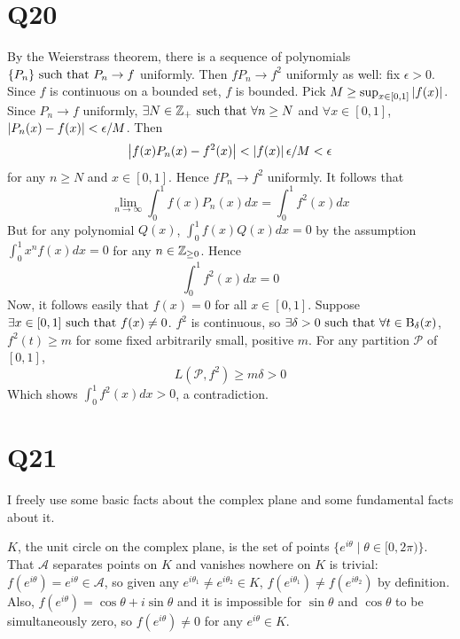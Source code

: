 \documentclass[12pt]{article}
\begin{document}
\section*{Q20}
By the Weierstrass theorem, there is a sequence of polynomials $\{P_n\} \text{ such that } P_n \rightarrow f$ uniformly. 
Then $f P_n \rightarrow f^2$ uniformly as well: 
fix $\epsilon > 0$. 
Since $f$ is continuous on a bounded set, $f$ is bounded.
Pick $M \geq \sup_{x \in [0, 1]} \left|f(x)\right|$. 
Since $P_n \rightarrow f$ uniformly, $\exists N \in \mathbb{Z}_{+} \text{ such that } \forall n \geq N$ and $\forall x \in [0, 1]$, $\left|P_n(x) - f(x)\right| < \epsilon / M$. 
Then 
$$\left|f(x) P_n(x) - f^2(x)\right| < \left|f(x)\right| \epsilon / M < \epsilon$$
for any $n \geq N$ and $x \in [0, 1]$. 
Hence $f P_n \rightarrow f^2$ uniformly. 
It follows that 
$$\lim_{n \rightarrow \infty} \int_{0}^{1} f(x) P_n(x) dx = \int_{0}^{1} f^2(x) dx$$ 
But for any polynomial $Q(x)$, $\int_{0}^{1} f(x) Q(x)dx = 0$ by the assumption $\int_{0}^{1} x^n f(x) dx = 0$ for any $n \in \mathbb{Z}_{\geq 0}$.  
Hence 
$$\int_{0}^{1} f^2 (x) dx = 0$$ 
Now, it follows easily that $f(x) = 0$ for all $x \in [0, 1]$. 
Suppose $\exists x \in [0, 1] \text{ such that } f(x) \neq 0$. 
$f^2$ is continuous, so $\exists \delta > 0 \text{ such that } \forall t \in \text{B}_{\delta}(x)$, $f^2(t) \geq m$ for some fixed arbitrarily small, positive $m$. 
For any partition $\mathcal{P}$ of $[0, 1]$, 
$$L(\mathcal{P}, f^2) \geq m\delta > 0$$ 
Which shows $\int_{0}^{1} f^2 (x) dx > 0$, a contradiction. 

\section*{Q21}
I freely use some basic facts about the complex plane and some fundamental facts about it. 

$K$, the unit circle on the complex plane, is the set of points $\{e^{i\theta} \mid \theta \in [0, 2\pi)\}$. 
That $\mathscr{A}$ separates points on $K$ and vanishes nowhere on $K$ is trivial: 
$f(e^{i\theta}) = e^{i\theta} \in \mathscr{A}$, so given any $e^{i\theta_1} \neq e^{i\theta_2} \in K$, $f(e^{i\theta_1}) \neq f(e^{i\theta_2})$ by definition. 
Also, $f(e^{i\theta}) = \cos \theta + i \sin \theta$ and it is impossible for $\sin \theta$ and $\cos \theta$ to be simultaneously zero, so $f(e^{i\theta}) \neq 0$ for any $e^{i\theta} \in K$. 
\end{document}
